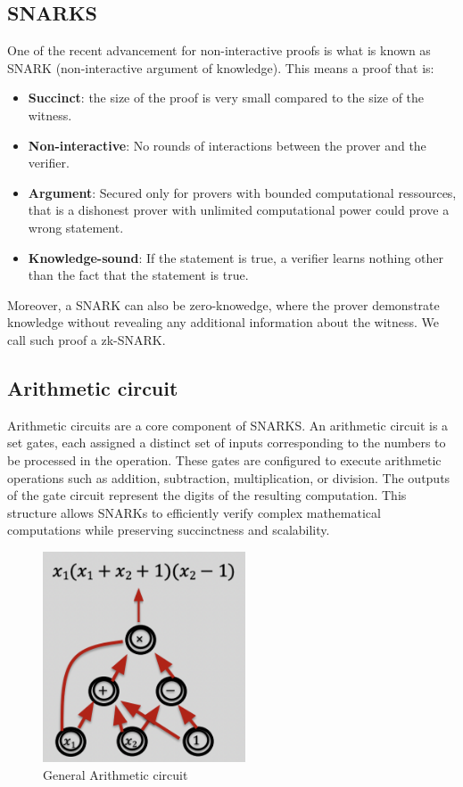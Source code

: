  \subsection{SNARKS} 
One of the recent advancement for non-interactive proofs is what is known as SNARK (non-interactive argument of knowledge).
This means a proof that is:
\begin{itemize}

    \item \textbf{Succinct}: the size of the proof is very small compared to the size of the witness.
    
    \item \textbf{Non-interactive}: No rounds of interactions between the prover and the verifier.

    \item \textbf{Argument}: Secured only for provers with bounded computational ressources, that is a dishonest prover with unlimited computational power could prove a wrong statement.

    \item \textbf{Knowledge-sound}: If the statement is true,  a verifier learns nothing other than the fact that the statement is true. \cite{NZ20}
    
    \end{itemize}

Moreover, a SNARK can also be zero-knowedge, where the prover demonstrate knowledge without revealing any additional information about the witness. We call such proof a zk-SNARK.

\subsection{Arithmetic circuit} 
\label{subsec:ac}


Arithmetic circuits are a core component of SNARKS. An arithmetic circuit is a set gates, each assigned a distinct set of inputs corresponding to the numbers to be processed in the operation. 
These gates are configured to execute arithmetic operations such as addition, subtraction, multiplication, or division. The outputs of the gate circuit represent the digits of the resulting computation.
This structure allows SNARKs to efficiently verify complex mathematical computations while preserving succinctness and scalability.

\begin{figure}[H]
    \centering
    \includegraphics[width=60mm]{ArithmeticCircuit.png}
    \caption{General Arithmetic circuit \cite{ZKM2}}
    \label{overflow}
    \end{figure}



